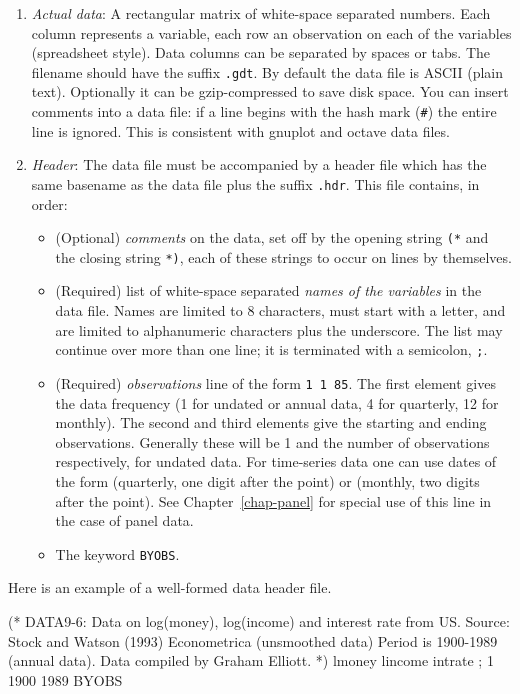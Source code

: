 \begin{enumerate}
\item \emph{Actual data}: A rectangular matrix of white-space
  separated numbers.  Each column represents a variable, each row an
  observation on each of the variables (spreadsheet style). Data
  columns can be separated by spaces or tabs. The filename should have
  the suffix \verb+.gdt+.  By default the data file is ASCII (plain
  text).  Optionally it can be gzip-compressed to save disk space. You
  can insert comments into a data file: if a line begins with the hash
  mark (\verb+#+) the entire line is ignored. This is consistent with
  gnuplot and octave data files.
\item \emph{Header}: The data file must be accompanied by a header
  file which has the same basename as the data file plus the suffix
  \verb+.hdr+.  This file contains, in order:
  \begin{itemize}
  \item (Optional) \emph{comments} on the data, set off by the opening
    string \verb+(*+ and the closing string \verb+*)+, each of these
    strings to occur on lines by themselves.
  \item (Required) list of white-space separated \emph{names of the
      variables} in the data file. Names are limited to 8 characters,
    must start with a letter, and are limited to alphanumeric
    characters plus the underscore.  The list may continue over more
    than one line; it is terminated with a semicolon, \verb+;+.
  \item (Required) \emph{observations} line of the form \verb+1 1 85+.
    The first element gives the data frequency (1 for undated or
    annual data, 4 for quarterly, 12 for monthly).  The second and
    third elements give the starting and ending observations.
    Generally these will be 1 and the number of observations
    respectively, for undated data.  For time-series data one can use
    dates of the form  (quarterly, one digit after the
    point) or  (monthly, two digits after the point).
    See Chapter~\ref{chap-panel} for special use of this line in the
    case of panel data.
  \item The keyword \verb+BYOBS+.
  \end{itemize}
\end{enumerate}

Here is an example of a well-formed data header file.

\begin{code} 
(* 
  DATA9-6: 
  Data on log(money), log(income) and interest rate from US. 
  Source: Stock and Watson (1993) Econometrica 
  (unsmoothed data) Period is 1900-1989 (annual data). 
  Data compiled by Graham Elliott. 
*) 
lmoney lincome intrate ; 
1 1900 1989 BYOBS
\end{code}

